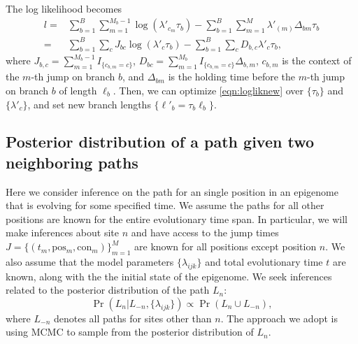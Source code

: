 \documentclass[11pt]{article}
\newcommand{\context}{\ensuremath{\mathrm{con}}}
\newcommand{\psn}{\ensuremath{\mathrm{pos}}}
\begin{document}
The log likelihood becomes
\begin{equation}\label{eqn:logliknew}
  \begin{aligned}
    l = & \sum\limits_{b=1}^B\sum\limits_{m=1}^{M_b-1} \log(\lambda'_{c_m}\tau_b) -  \sum\limits_{b=1}^B\sum\limits_{m=1}^{M} \lambda'_{(m)}\Delta_{bm}\tau_b \\
    = & \sum\limits_{b=1}^B\sum_{c} J_{bc}\log(\lambda'_c\tau_b)  - \sum\limits_{b=1}^B\sum_{c} D_{b,c}\lambda'_c\tau_b ,
  \end{aligned}
\end{equation}
where
$J_{b,c} = \sum\limits_{m=1}^{M_b-1}I_{\{c_{b,m}= c\}}$,
$D_{bc} = \sum\limits_{m=1}^{M_b}I_{\{c_{b,m} =c\}}\Delta_{b,m}$,
$c_{b,m}$ is the context of the $m$-th jump on branch $b$,
and $\Delta_{bm}$ is the holding time before the $m$-th jump on branch
$b$ of length $\ell_b$. Then, we can optimize \eqref{eqn:logliknew} over $\{\tau_b\}$
and $\{\lambda'_c\}$, and set new branch lengths $\{\ell'_b = \tau_b\ell_b\}$.



\subsection{Posterior distribution of a path given two neighboring paths}


Here we consider inference on the path for an single position in an
epigenome that is evolving for some specified time. We assume the
paths for all other positions are known for the entire evolutionary
time span. In particular, we will make inferences about site $n$ and
have access to the jump times $J = \{(t_m, \psn{}_m, \context{}_m)
\}_{m=1}^{M}$ are known for all positions except position $n$.
We also assume that the model parameters $\{\lambda_{ijk}\}$ and total
evolutionary time $t$ are known, along with the the initial state of
the epigenome. We seek inferences related to the posterior
distribution of the path $L_n$:
\[
\Pr(L_n|L_{-n}, \{\lambda_{ijk}\}) \propto \Pr(L_n\cup L_{-n}),
\]
where $L_{-n}$ denotes all paths for sites other than $n$. The
approach we adopt is using MCMC to sample from the posterior
distribution of $L_n$.
\end{document}
